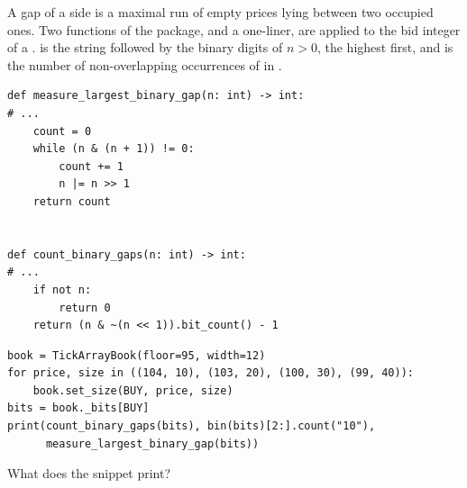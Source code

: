 \begin{question}
\label{question.gapsOfTheUncutBidOccupancy}
A gap of a side is a maximal run of empty prices lying between two occupied ones.
Two functions of the package, and a one-liner, are applied to the bid integer of a
.
 is the string  followed by the binary digits of $n > 0$, the highest first,
and  is the number of non-overlapping occurrences of  in .
\begin{lstlisting}[caption={\protect\codehl{unito26.lob.binary\_gaps}: two functions, their docstrings elided.}, label=listing.gapsUncutFunctions]
def measure_largest_binary_gap(n: int) -> int:
# ...
    count = 0
    while (n & (n + 1)) != 0:
        count += 1
        n |= n >> 1
    return count


def count_binary_gaps(n: int) -> int:
# ...
    if not n:
        return 0
    return (n & ~(n << 1)).bit_count() - 1
\end{lstlisting}
\begin{lstlisting}[caption={Three readings of the bid integer}, label=listing.gapsUncutRun]
book = TickArrayBook(floor=95, width=12)
for price, size in ((104, 10), (103, 20), (100, 30), (99, 40)):
    book.set_size(BUY, price, size)
bits = book._bits[BUY]
print(count_binary_gaps(bits), bin(bits)[2:].count("10"),
      measure_largest_binary_gap(bits))
\end{lstlisting}
What does the snippet print?
\begin{choices}
 \correctchoice {}
 \choice {}
 \choice {}
 \choice {}
 \choice {}
\end{choices}
\end{question}

